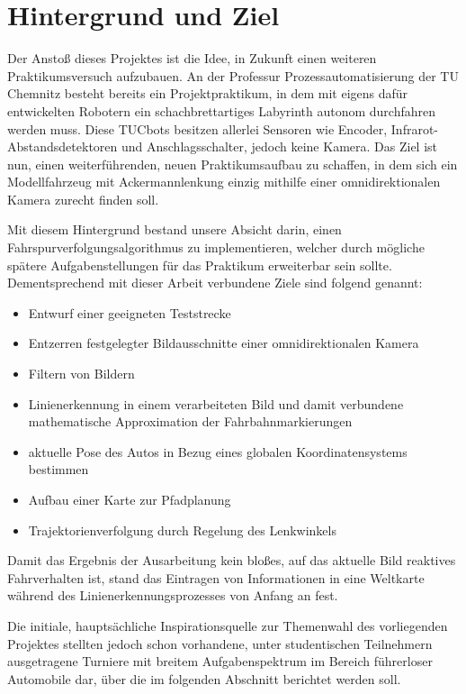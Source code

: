 \section{Hintergrund und Ziel}

Der Anstoß dieses Projektes ist die Idee, in Zukunft einen weiteren Praktikumsversuch aufzubauen. An der Professur Prozessautomatisierung der TU Chemnitz besteht bereits ein Projektpraktikum, in dem mit eigens dafür entwickelten Robotern ein schachbrettartiges Labyrinth autonom durchfahren werden muss. Diese \glqq TUCbots\grqq{} besitzen allerlei Sensoren wie Encoder, Infrarot-Abstandsdetektoren und Anschlagsschalter, jedoch keine Kamera. Das Ziel ist nun, einen weiterführenden, neuen Praktikumsaufbau zu schaffen, in dem sich ein Modellfahrzeug mit Ackermannlenkung einzig mithilfe einer omnidirektionalen Kamera zurecht finden soll. 

Mit diesem Hintergrund bestand unsere Absicht darin, einen Fahrspurverfolgungsalgorithmus zu implementieren, welcher durch mögliche spätere Aufgabenstellungen für das Praktikum erweiterbar sein sollte. Dementsprechend mit dieser Arbeit verbundene Ziele sind folgend genannt:

\begin{itemize}
\item Entwurf einer geeigneten Teststrecke
\item Entzerren festgelegter Bildausschnitte einer omnidirektionalen Kamera
\item Filtern von Bildern
\item Linienerkennung in einem verarbeiteten Bild und damit verbundene mathematische Approximation der Fahrbahnmarkierungen
\item aktuelle Pose des Autos in Bezug eines globalen Koordinatensystems bestimmen
\item Aufbau einer Karte zur Pfadplanung
\item Trajektorienverfolgung durch Regelung des Lenkwinkels
\end{itemize}

Damit das Ergebnis der Ausarbeitung kein bloßes, auf das aktuelle Bild reaktives Fahrverhalten ist, stand das Eintragen von Informationen in eine Weltkarte während des Linienerkennungsprozesses von Anfang an fest. 

Die initiale, hauptsächliche Inspirationsquelle zur Themenwahl des vorliegenden Projektes stellten jedoch schon vorhandene, unter studentischen Teilnehmern ausgetragene Turniere mit breitem Aufgabenspektrum im Bereich führerloser Automobile dar, über die im folgenden Abschnitt berichtet werden soll.
